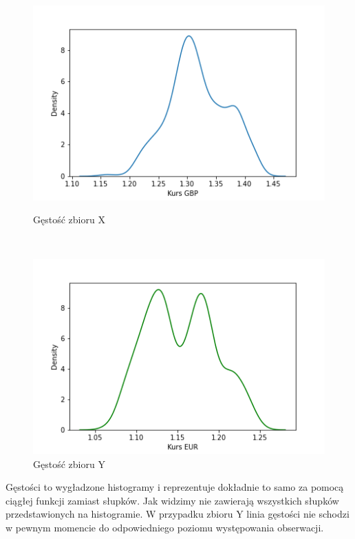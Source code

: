 \documentclass[12pt]{mwart}
\begin{document}
\begin{figure}[H]
	\begin{minipage}{.5\linewidth}
		\centering
		\includegraphics[scale=0.7]{X_kde.PNG}
		\caption{Gęstość zbioru X}
	\end{minipage}
	$\quad$
	\begin{minipage}{.5\linewidth}
		\centering
		\includegraphics[scale=0.7]{Y_kde.PNG}
		\caption{Gęstość zbioru Y}
	\end{minipage}
\end{figure}
\noindent Gęstości to wygładzone histogramy i reprezentuje dokładnie to samo za pomocą ciągłej funkcji zamiast słupków. Jak widzimy nie zawierają wszystkich słupków przedstawionych na histogramie. W przypadku zbioru Y linia gęstości nie schodzi w pewnym momencie do odpowiedniego poziomu występowania obserwacji.
\end{document}
